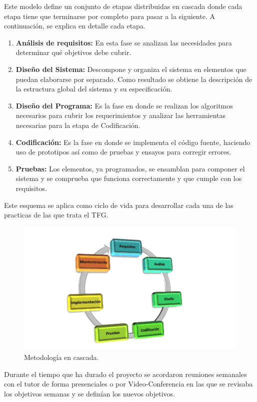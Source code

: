Este modelo define un conjunto de etapas distribuidas en cascada donde cada etapa tiene que terminarse por completo para pasar a la siguiente. A continuación, se explica en detalle cada etapa.
\begin{enumerate}
\item \textbf{Análisis de requisitos:} En esta fase se analizan las necesidades para determinar qué objetivos debe cubrir.
\item \textbf{Diseño del Sistema:} Descompone y organiza el sistema en elementos que puedan elaborarse por separado. Como resultado se obtiene la descripción de la estructura global del sistema y su especificación.
\item \textbf{Diseño del Programa:} Es la fase en donde se realizan los algoritmos necesarios para cubrir los requerimientos y analizar las herramientas necesarias para la etapa de Codificación.
\item \textbf{Codificación:} Es la fase en donde se implementa el código fuente, haciendo uso de prototipos así como de pruebas y ensayos para corregir errores.
\item \textbf{Pruebas:} Los elementos, ya programados, se ensamblan para componer el sistema y se comprueba que funciona correctamente y que cumple con los requisitos.
\end{enumerate}
Este esquema se aplica como ciclo de vida para desarrollar cada una de las practicas de las que trata el TFG.
\begin{figure}[!h]
\centering
\includegraphics[width=0.8\linewidth]{Figures/cascada}
\decoRule
\caption[Metodología en cascada]{Metodología en cascada.}
\label{fig:espiral}
\end{figure}

Durante el tiempo que ha durado el proyecto se acordaron reuniones semanales con el tutor de forma presenciales o por Video-Conferencia en las que se revisaba los objetivos semanas y se definían los nuevos objetivos.

